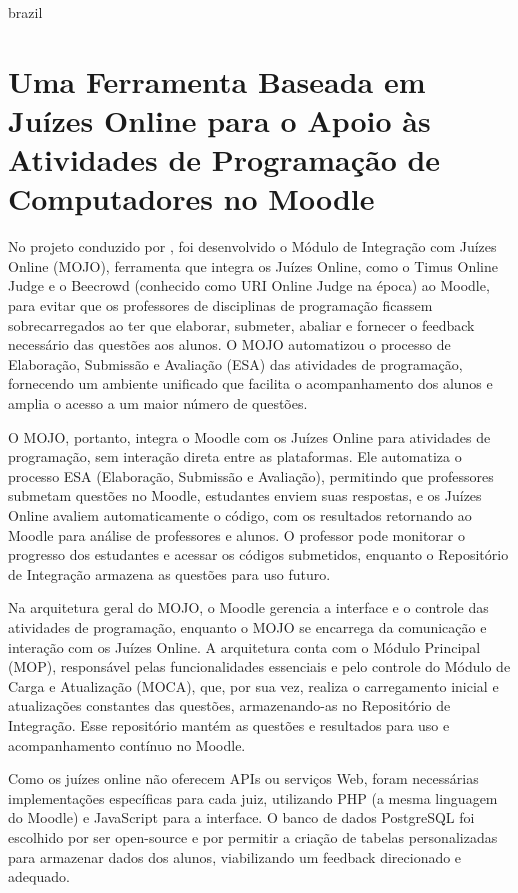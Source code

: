 \begin{otherlanguage*}{brazil}
\section{Uma Ferramenta Baseada em Juízes Online para o Apoio às Atividades de Programação de Computadores no Moodle}

No projeto conduzido por \textcite{joseosvaldochaves}, foi desenvolvido o Módulo de Integração com Juízes Online (MOJO), ferramenta que integra os Juízes Online, como o Timus Online Judge e o Beecrowd (conhecido como URI Online Judge na época) ao Moodle, para evitar que os professores de disciplinas de programação ficassem sobrecarregados ao ter que elaborar, submeter, abaliar e fornecer o feedback necessário das questões aos alunos. O MOJO automatizou o processo de Elaboração, Submissão e Avaliação (ESA) das atividades de programação, fornecendo um ambiente unificado que facilita o acompanhamento dos alunos e amplia o acesso a um maior número de questões.

O MOJO, portanto, integra o Moodle com os Juízes Online para atividades de programação, sem interação direta entre as plataformas. Ele automatiza o processo ESA (Elaboração, Submissão e Avaliação), permitindo que professores submetam questões no Moodle, estudantes enviem suas respostas, e os Juízes Online avaliem automaticamente o código, com os resultados retornando ao Moodle para análise de professores e alunos. O professor pode monitorar o progresso dos estudantes e acessar os códigos submetidos, enquanto o Repositório de Integração armazena as questões para uso futuro.

Na arquitetura geral do MOJO, o Moodle gerencia a interface e o controle das atividades de programação, enquanto o MOJO se encarrega da comunicação e interação com os Juízes Online. A arquitetura conta com o Módulo Principal (MOP), responsável pelas funcionalidades essenciais e pelo controle do Módulo de Carga e Atualização (MOCA), que, por sua vez, realiza o carregamento inicial e atualizações constantes das questões, armazenando-as no Repositório de Integração. Esse repositório mantém as questões e resultados para uso e acompanhamento contínuo no Moodle.

Como os juízes online não oferecem APIs ou serviços Web, foram necessárias implementações específicas para cada juiz, utilizando PHP (a mesma linguagem do Moodle) e JavaScript para a interface. O banco de dados PostgreSQL foi escolhido por ser open-source e por permitir a criação de tabelas personalizadas para armazenar dados dos alunos, viabilizando um feedback direcionado e adequado.


\end{otherlanguage*}
